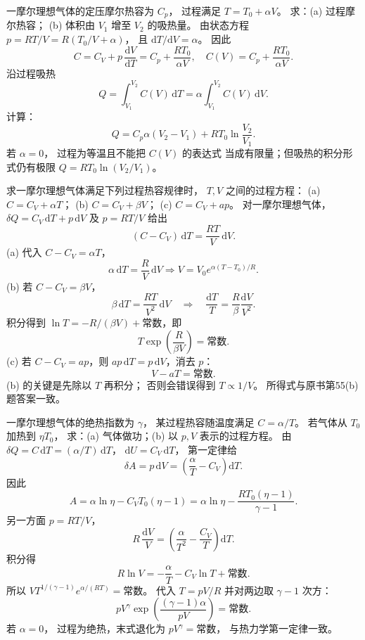 一摩尔理想气体的定压摩尔热容为 $C_p$，
过程满足 $T=T_0+\alpha V$。
求：(a) 过程摩尔热容；
(b) 体积由 $V_1$ 增至 $V_2$ 的吸热量。
\exsolution
由状态方程
$p=RT/V=R(T_0/V+\alpha)$，
且 $\mathrm dT/\mathrm dV=\alpha$。
因此
\[
C=C_V+p\,\frac{\mathrm dV}{\mathrm dT}
=C_p+\frac{RT_0}{\alpha V},
\quad
\boxed{C(V)=C_p+\frac{RT_0}{\alpha V}}.
\]
沿过程吸热
\[
Q=\int_{V_1}^{V_2}C(V)\,\mathrm dT
=\alpha\int_{V_1}^{V_2}C(V)\,\mathrm dV.
\]
计算：
\[
\boxed{Q=C_p\alpha(V_2-V_1)+
RT_0\ln\frac{V_2}{V_1}}.
\]
\excheck 若 $\alpha=0$，
过程为等温且不能把 $C(V)$ 的表达式
当成有限量；但吸热的积分形式仍有极限
$Q=RT_0\ln(V_2/V_1)$。

求一摩尔理想气体满足下列过程热容规律时，
$T,V$ 之间的过程方程：
(a) $C=C_V+\alpha T$；
(b) $C=C_V+\beta V$；
(c) $C=C_V+a p$。
\exsolution
对一摩尔理想气体，
$\delta Q=C_V\,\mathrm dT+p\,\mathrm dV$
及 $p=RT/V$ 给出
\[
(C-C_V)\,\mathrm dT
=\frac{RT}{V}\,\mathrm dV.
\]
(a) 代入 $C-C_V=\alpha T$，
\[
\alpha\,\mathrm dT=\frac R V\,\mathrm dV
\Longrightarrow
\boxed{V=V_0e^{\alpha(T-T_0)/R}}.
\]
(b) 若 $C-C_V=\beta V$，
\[
\beta\,\mathrm dT=\frac{RT}{V^2}\,\mathrm dV
\quad\Longrightarrow\quad
\frac{\mathrm dT}{T}=\frac R\beta\frac{\mathrm dV}{V^2}.
\]
积分得到
$\ln T=-R/(\beta V)+\text{常数}$，即
\[
\boxed{T\exp\left(\frac R{\beta V}\right)=\text{常数}}.
\]
(c) 若 $C-C_V=ap$，则
$ap\,\mathrm dT=p\,\mathrm dV$，消去 $p$：
\[
\boxed{V-aT=\text{常数}}.
\]
\excheck (b) 的关键是先除以 $T$ 再积分；
否则会错误得到 $T\propto1/V$。
所得式与原书第55(b)题答案一致。

一摩尔理想气体的绝热指数为 $\gamma$，
某过程热容随温度满足 $C=\alpha/T$。
若气体从 $T_0$ 加热到 $\eta T_0$，
求：(a) 气体做功；(b) 以 $p,V$ 表示的过程方程。
\exsolution
由
$\delta Q=C\,\mathrm dT=(\alpha/T)\,\mathrm dT$，
$\mathrm dU=C_V\,\mathrm dT$，
第一定律给
\[
\delta A=p\,\mathrm dV
=\left(\frac{\alpha}{T}-C_V\right)\mathrm dT.
\]
因此
\[
\boxed{A=\alpha\ln\eta-C_VT_0(\eta-1)
=\alpha\ln\eta-\frac{RT_0(\eta-1)}{\gamma-1}}.
\]
另一方面 $p=RT/V$，
\[
R\,\frac{\mathrm dV}{V}
=\left(\frac{\alpha}{T^2}-\frac{C_V}{T}\right)\mathrm dT.
\]
积分得
\[
R\ln V=-\frac\alpha T-C_V\ln T+\text{常数}.
\]
所以
$V T^{1/(\gamma-1)}e^{\alpha/(RT)}=\text{常数}$。
代入 $T=pV/R$ 并对两边取
$\gamma-1$ 次方：
\[
\boxed{pV^\gamma
\exp\left(\frac{(\gamma-1)\alpha}{pV}\right)
=\text{常数}}.
\]
\excheck 若 $\alpha=0$，
过程为绝热，末式退化为
$pV^\gamma=\text{常数}$，
与热力学第一定律一致。
